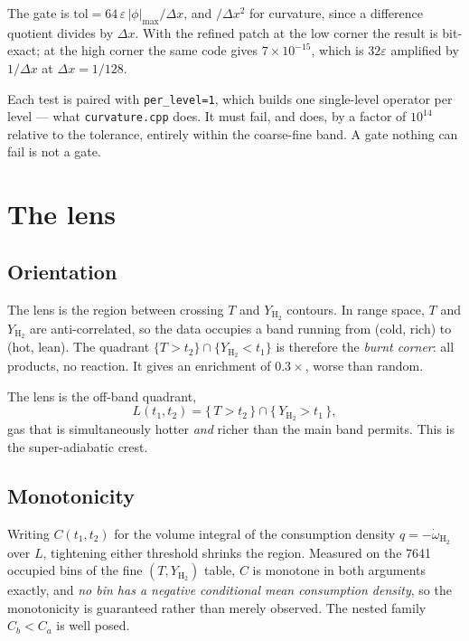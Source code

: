 \documentclass[11pt]{article}
\newcommand{\YH}{Y_{\mathrm{H_2}}}
\begin{document}
The gate is $\mathrm{tol} = 64\,\varepsilon\,|\phi|_{\max}/\Delta x$, and
$/\Delta x^2$ for curvature, since a difference quotient divides by $\Delta
x$. With the refined patch at the low corner the result is bit-exact; at the
high corner the same code gives $7\times10^{-15}$, which is $32\varepsilon$
amplified by $1/\Delta x$ at $\Delta x = 1/128$.

Each test is paired with \texttt{per\_level=1}, which builds one single-level
operator per level --- what \texttt{curvature.cpp} does. It must fail, and
does, by a factor of $10^{14}$ relative to the tolerance, entirely within the
coarse-fine band. A gate nothing can fail is not a gate.

\section{The lens}
\label{sec:lens}

\subsection{Orientation}

The lens is the region between crossing $T$ and $\YH$ contours. In range
space, $T$ and $\YH$ are anti-correlated, so the data occupies a band running
from (cold, rich) to (hot, lean). The quadrant $\{T > t_2\} \cap \{\YH <
t_1\}$ is therefore the \emph{burnt corner}: all products, no reaction. It
gives an enrichment of $0.3\times$, worse than random.

The lens is the off-band quadrant,
\begin{equation}
  L(t_1,t_2) = \{\, T > t_2 \,\} \cap \{\, \YH > t_1 \,\},
\end{equation}
gas that is simultaneously hotter \emph{and} richer than the main band
permits. This is the super-adiabatic crest.

\subsection{Monotonicity}

Writing $C(t_1,t_2)$ for the volume integral of the consumption density
$q = -\dot{\omega}_{\mathrm{H_2}}$ over $L$, tightening either threshold
shrinks the region. Measured on the 7641 occupied bins of the fine
$(T,\YH)$ table, $C$ is monotone in both arguments exactly, and \emph{no bin
has a negative conditional mean consumption density}, so the monotonicity is
guaranteed rather than merely observed. The nested family $C_b < C_a$ is
well posed.
\end{document}
